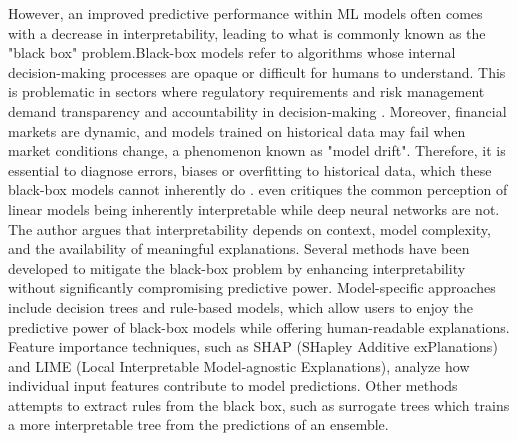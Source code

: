 However, an improved predictive performance within ML models often comes with a decrease in interpretability,  leading to what is commonly known as the "black box" problem.Black-box models refer to algorithms whose internal decision-making processes are opaque or difficult for humans to understand. This is problematic in sectors where regulatory requirements and risk management demand transparency and accountability in decision-making \cite{brozek_2024}.  Moreover, financial markets are dynamic, and models trained on historical data may fail when market conditions change, a phenomenon known as "model drift". Therefore, it is essential to diagnose errors, biases or overfitting to historical data, which these black-box models cannot inherently do \cite{cohen_2021}.  even critiques the common perception of linear models being inherently interpretable while deep neural networks are not. The author argues that interpretability depends on context, model complexity, and the availability of meaningful explanations. Several methods have been developed to mitigate the black-box problem by enhancing interpretability without significantly compromising predictive power. Model-specific approaches include decision trees and rule-based models, which allow users to enjoy the predictive power of black-box models while offering human-readable explanations. Feature importance techniques, such as SHAP (SHapley Additive exPlanations) and LIME (Local Interpretable Model-agnostic Explanations), analyze how individual input features contribute to model predictions. Other methods attempts to extract rules from the black box, such as surrogate trees which trains a more interpretable tree from the predictions of an ensemble.

